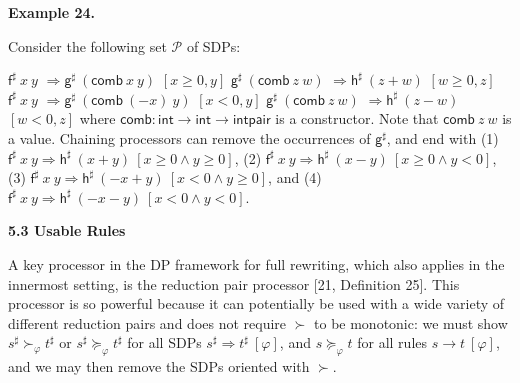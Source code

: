 \documentclass[10pt,a4paper]{amsart}
\begin{document}
 
 
 
\par\medskip\noindent\textbf{Example 24.}\par
 
 
Consider the following set $\mathcal{P}$ of SDPs:\par
    $\displaystyle{{\mathsf{f}^{\sharp}}\ {x}}\ {y}$ $\displaystyle\Rightarrow{\mathsf{g}^{\sharp}}\ {({{\mathsf{comb}}\ {x}}\ {y})}$ $\displaystyle[x\geq 0,y]$ $\displaystyle{\mathsf{g}^{\sharp}}\ {({{\mathsf{comb}}\ {z}}\ {w})}$ $\displaystyle\Rightarrow{\mathsf{h}^{\sharp}}\ {(z+w)}$ $\displaystyle[w\geq 0,z]$     $\displaystyle{{\mathsf{f}^{\sharp}}\ {x}}\ {y}$ $\displaystyle\Rightarrow{\mathsf{g}^{\sharp}}\ {({{\mathsf{comb}}\ {(-x)}}\ {y})}$ $\displaystyle[x<0,y]$ $\displaystyle{\mathsf{g}^{\sharp}}\ {({{\mathsf{comb}}\ {z}}\ {w})}$ $\displaystyle\Rightarrow{\mathsf{h}^{\sharp}}\ {(z-w)}$ $\displaystyle[w<0,z]$    
where $\mathsf{comb}:\mathsf{int}\rightarrow\mathsf{int}\rightarrow\mathsf{intpair}$ is a constructor. Note that ${{\mathsf{comb}}\ {z}}\ {w}$ is a value. Chaining processors can remove the occurrences of $\mathsf{g}^{\sharp}$, and end with (1) ${{{\mathsf{f}^{\sharp}}\ {x}}\ {y}}\Rightarrow{{\mathsf{h}^{\sharp}}\ {(x+y)}}\ [x\geq 0\wedge y\geq 0]$, (2) ${{{\mathsf{f}^{\sharp}}\ {x}}\ {y}}\Rightarrow{{\mathsf{h}^{\sharp}}\ {(x-y)}}\ [x\geq 0\wedge y<0]$, (3) ${{{\mathsf{f}^{\sharp}}\ {x}}\ {y}}\Rightarrow{{\mathsf{h}^{\sharp}}\ {(-x+y)}}\ [x<0\wedge y\geq 0]$, and (4) ${{{\mathsf{f}^{\sharp}}\ {x}}\ {y}}\Rightarrow{{\mathsf{h}^{\sharp}}\ {(-x-y)}}\ [x<0\wedge y<0]$.\par
 
 
 
 
 
\par\medskip\noindent\textbf{5.3 Usable Rules}\par
 
 
A key processor in the DP framework for full rewriting, which also applies in the innermost setting, is the reduction pair processor [21, Definition 25]. This processor is so powerful because it can potentially be used with a wide variety of different reduction pairs and does not require $\succ$ to be monotonic: we must show ${s^{\sharp}}\mathrel{\succ}_{\varphi}{t^{\sharp}}$ or ${s^{\sharp}}\mathrel{\succeq}_{\varphi}{t^{\sharp}}$ for all SDPs ${s^{\sharp}}\Rightarrow{t^{\sharp}}\ [\varphi]$, and ${s}\mathrel{\succeq}_{\varphi}{t}$ for all rules ${s}\rightarrow{t}\ [\varphi]$, and we may then remove the SDPs oriented with $\succ$.\par
 
\end{document}
